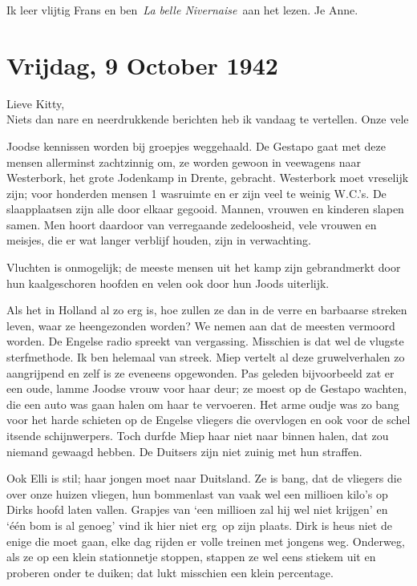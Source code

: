 \documentclass{book}
\begin{document}
Ik leer vlijtig Frans en ben~\emph{La belle Nivernaise}~aan het lezen.
Je Anne.

\chapter{Vrijdag, 9 October 1942}

Lieve Kitty,\\Niets dan nare en neerdrukkende berichten heb ik vandaag
te vertellen. Onze vele

Joodse kennissen worden bij groepjes weggehaald. De Gestapo gaat met
deze mensen allerminst zachtzinnig om, ze worden gewoon in veewagens
naar Westerbork, het grote Jodenkamp in Drente, gebracht. Westerbork
moet vreselijk zijn; voor honderden mensen 1 wasruimte en er zijn veel
te weinig W.C.'s. De slaapplaatsen zijn alle door elkaar gegooid.
Mannen, vrouwen en kinderen slapen samen. Men hoort daardoor van
verregaande zedeloosheid, vele vrouwen en meisjes, die er wat langer
verblijf houden, zijn in verwachting.

Vluchten is onmogelijk; de meeste mensen uit het kamp zijn gebrandmerkt
door hun kaalgeschoren hoofden en velen ook door hun Joods uiterlijk.

Als het in Holland al zo erg is, hoe zullen ze dan in de verre en
barbaarse streken leven, waar ze heengezonden worden? We nemen aan dat
de meesten vermoord worden. De Engelse radio spreekt van vergassing.
Misschien is dat wel de vlugste sterfmethode. Ik ben helemaal van
streek. Miep vertelt al deze gruwelverhalen zo aangrijpend en zelf is ze
eveneens opgewonden. Pas geleden bijvoorbeeld zat er een oude, lamme
Joodse vrouw voor haar deur; ze moest op de Gestapo wachten, die een
auto was gaan halen om haar te vervoeren. Het arme oudje was zo bang
voor het harde schieten op de Engelse vliegers die overvlogen en ook
voor de schel itsende schijnwerpers. Toch durfde Miep haar niet naar
binnen halen, dat zou niemand gewaagd hebben. De Duitsers zijn niet
zuinig met hun straffen.

Ook Elli is stil; haar jongen moet naar Duitsland. Ze is bang, dat de
vliegers die over onze huizen vliegen, hun bommenlast van vaak wel een
millioen kilo's op Dirks hoofd laten vallen. Grapjes van `een millioen
zal hij wel niet krijgen' en `één bom is al genoeg' vind ik hier niet
erg~op zijn plaats. Dirk is heus niet de enige die moet gaan, elke dag
rijden er volle treinen met jongens weg. Onderweg, als ze op een klein
stationnetje stoppen, stappen ze wel eens stiekem uit en proberen onder
te duiken; dat lukt misschien een klein percentage.
\end{document}
